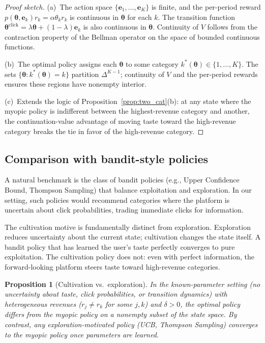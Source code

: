 \documentclass[11pt]{article}
\newtheorem{proposition}{Proposition}
\begin{document}
\begin{proof}[Proof sketch]
(a)~The action space $\{\mathbf{e}_1, \ldots, \mathbf{e}_K\}$ is finite, and the per-period reward $p(\boldsymbol{\theta}, \mathbf{e}_k) r_k = \alpha \theta_k r_k$ is continuous in $\boldsymbol{\theta}$ for each $k$. The transition function $\boldsymbol{\theta}^{\text{click}} = \lambda \boldsymbol{\theta} + (1-\lambda)\mathbf{e}_k$ is also continuous in $\boldsymbol{\theta}$. Continuity of $V$ follows from the contraction property of the Bellman operator on the space of bounded continuous functions.

(b)~The optimal policy assigns each $\boldsymbol{\theta}$ to some category $k^*(\boldsymbol{\theta}) \in \{1, \ldots, K\}$. The sets $\{\boldsymbol{\theta} : k^*(\boldsymbol{\theta}) = k\}$ partition $\Delta^{K-1}$; continuity of $V$ and the per-period rewards ensures these regions have nonempty interior.

(c)~Extends the logic of Proposition~\ref{prop:two_cat}(b): at any state where the myopic policy is indifferent between the highest-revenue category and another, the continuation-value advantage of moving taste toward the high-revenue category breaks the tie in favor of the high-revenue category.
\end{proof}

\subsection{Comparison with bandit-style policies}

A natural benchmark is the class of bandit policies (e.g., Upper Confidence Bound, Thompson Sampling) that balance exploitation and exploration. In our setting, such policies would recommend categories where the platform is uncertain about click probabilities, trading immediate clicks for information.

The cultivation motive is fundamentally distinct from exploration. Exploration reduces uncertainty about the current state; cultivation changes the state itself. A bandit policy that has learned the user's taste perfectly converges to pure exploitation. The cultivation policy does not: even with perfect information, the forward-looking platform steers taste toward high-revenue categories.

\begin{proposition}[Cultivation vs.\ exploration]\label{prop:cult_explore}
In the known-parameter setting (no uncertainty about taste, click probabilities, or transition dynamics) with heterogeneous revenues ($r_j \neq r_k$ for some $j, k$) and $\delta > 0$, the optimal policy differs from the myopic policy on a nonempty subset of the state space. By contrast, any exploration-motivated policy (UCB, Thompson Sampling) converges to the myopic policy once parameters are learned.
\end{proposition}
\end{document}
